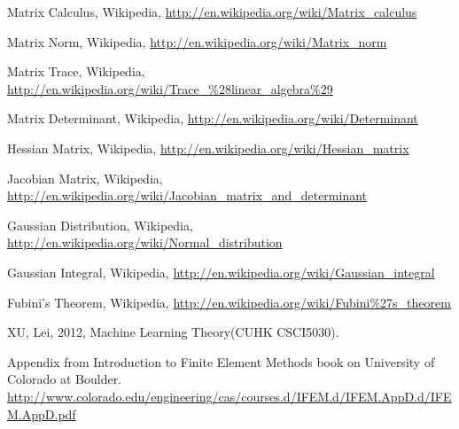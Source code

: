 	Matrix Calculus, Wikipedia, 
	\url{http://en.wikipedia.org/wiki/Matrix_calculus}
	
	Matrix Norm, Wikipedia, 
	\url{http://en.wikipedia.org/wiki/Matrix_norm}
	
	Matrix Trace, Wikipedia, 
	\url{http://en.wikipedia.org/wiki/Trace_%28linear_algebra%29}
	
	Matrix Determinant, Wikipedia, 
	\url{http://en.wikipedia.org/wiki/Determinant}
	
	Hessian Matrix, Wikipedia, 
	\url{http://en.wikipedia.org/wiki/Hessian_matrix}
	
	Jacobian Matrix, Wikipedia, 
	\url{http://en.wikipedia.org/wiki/Jacobian_matrix_and_determinant}
	
	Gaussian Distribution, Wikipedia, 
	\url{http://en.wikipedia.org/wiki/Normal_distribution}	
	
	Gaussian Integral, Wikipedia, 
	\url{http://en.wikipedia.org/wiki/Gaussian_integral}

	Fubini's Theorem, Wikipedia, 
	\url{http://en.wikipedia.org/wiki/Fubini%27s_theorem}
	
	XU, Lei, 2012, Machine Learning Theory(CUHK CSCI5030). 
	
	Appendix from Introduction to Finite Element Methods 
	book on University of Colorado at Boulder. 
	\url{http://www.colorado.edu/engineering/cas/courses.d/IFEM.d/IFEM.AppD.d/IFEM.AppD.pdf}